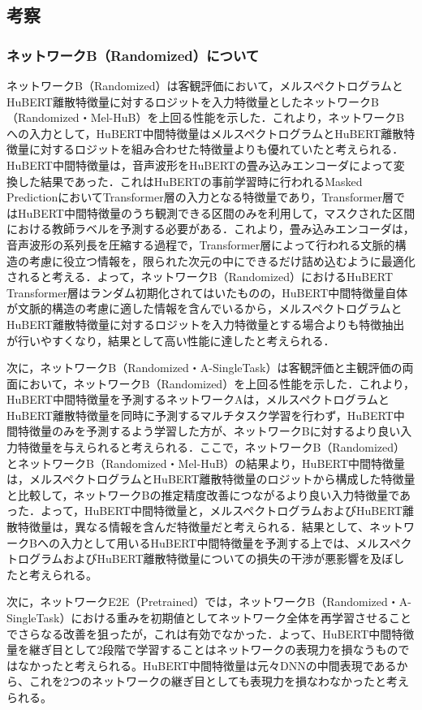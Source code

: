 \subsection{考察}
\subsubsection{ネットワークB（Randomized）について}
\label{sec4:sec:consideration_b_randomized}
ネットワークB（Randomized）は客観評価において，メルスペクトログラムとHuBERT離散特徴量に対するロジットを入力特徴量としたネットワークB（Randomized・Mel-HuB）を上回る性能を示した．これより，ネットワークBへの入力として，HuBERT中間特徴量はメルスペクトログラムとHuBERT離散特徴量に対するロジットを組み合わせた特徴量よりも優れていたと考えられる．HuBERT中間特徴量は，音声波形をHuBERTの畳み込みエンコーダによって変換した結果であった．これはHuBERTの事前学習時に行われるMasked PredictionにおいてTransformer層の入力となる特徴量であり，Transformer層ではHuBERT中間特徴量のうち観測できる区間のみを利用して，マスクされた区間における教師ラベルを予測する必要がある．これより，畳み込みエンコーダは，音声波形の系列長を圧縮する過程で，Transformer層によって行われる文脈的構造の考慮に役立つ情報を，限られた次元の中にできるだけ詰め込むように最適化されると考える．よって，ネットワークB（Randomized）におけるHuBERT Transformer層はランダム初期化されてはいたものの，HuBERT中間特徴量自体が文脈的構造の考慮に適した情報を含んでいるから，メルスペクトログラムとHuBERT離散特徴量に対するロジットを入力特徴量とする場合よりも特徴抽出が行いやすくなり，結果として高い性能に達したと考えられる．

次に，ネットワークB（Randomized・A-SingleTask）は客観評価と主観評価の両面において，ネットワークB（Randomized）を上回る性能を示した．これより，HuBERT中間特徴量を予測するネットワークAは，メルスペクトログラムとHuBERT離散特徴量を同時に予測するマルチタスク学習を行わず，HuBERT中間特徴量のみを予測するよう学習した方が、ネットワークBに対するより良い入力特徴量を与えられると考えられる．ここで，ネットワークB（Randomized）とネットワークB（Randomized・Mel-HuB）の結果より，HuBERT中間特徴量は，メルスペクトログラムとHuBERT離散特徴量のロジットから構成した特徴量と比較して，ネットワークBの推定精度改善につながるより良い入力特徴量であった．よって，HuBERT中間特徴量と，メルスペクトログラムおよびHuBERT離散特徴量は，異なる情報を含んだ特徴量だと考えられる．結果として、ネットワークBへの入力として用いるHuBERT中間特徴量を予測する上では、メルスペクトログラムおよびHuBERT離散特徴量についての損失の干渉が悪影響を及ぼしたと考えられる。

次に，ネットワークE2E（Pretrained）では，ネットワークB（Randomized・A-SingleTask）における重みを初期値としてネットワーク全体を再学習させることでさらなる改善を狙ったが，これは有効でなかった．よって、HuBERT中間特徴量を継ぎ目として2段階で学習することはネットワークの表現力を損なうものではなかったと考えられる。HuBERT中間特徴量は元々DNNの中間表現であるから、これを2つのネットワークの継ぎ目としても表現力を損なわなかったと考えられる。


